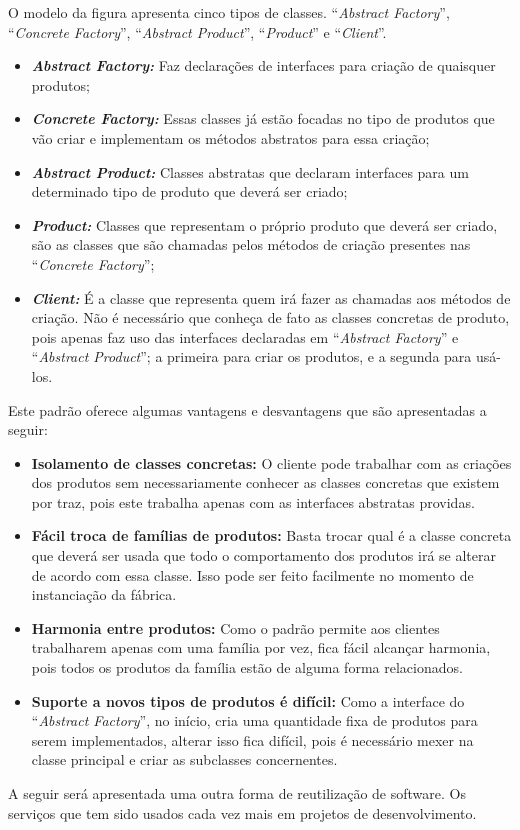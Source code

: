 \begin{apendicesenv}
O modelo da figura apresenta cinco tipos de classes. ``\textit{Abstract Factory}'', ``\textit{Concrete Factory}'', ``\textit{Abstract Product}'', ``\textit{Product}'' e ``\textit{Client}''.

\begin{itemize}
	\item \textbf{\textit{Abstract Factory:}} Faz declarações de interfaces para criação de quaisquer produtos;
	\item \textbf{\textit{Concrete Factory:}} Essas classes já estão focadas no tipo de produtos que vão criar e implementam os métodos abstratos para essa criação;
	\item \textbf{\textit{Abstract Product:}} Classes abstratas que declaram interfaces para um determinado tipo de produto que deverá ser criado;
	\item \textbf{\textit{Product:}} Classes que representam o próprio produto que deverá ser criado, são as classes que são chamadas pelos métodos de criação presentes nas ``\textit{Concrete Factory}'';
	\item \textbf{\textit{Client:}} É a classe que representa quem irá fazer as chamadas aos métodos de criação. Não é necessário que conheça de fato as classes concretas de produto, pois apenas faz uso das interfaces declaradas em ``\textit{Abstract Factory}'' e ``\textit{Abstract Product}''; a primeira para criar os produtos, e a segunda para usá-los.
\end{itemize}

Este padrão oferece algumas vantagens e desvantagens que são apresentadas a seguir:

\begin{itemize}
	\item \textbf{Isolamento de classes concretas:} O cliente pode trabalhar com as criações dos produtos sem necessariamente conhecer as classes concretas que existem por traz, pois este trabalha apenas com as interfaces abstratas providas.
	\item \textbf{Fácil troca de famílias de produtos:} Basta trocar qual é a classe concreta que deverá ser usada que todo o comportamento dos produtos irá se alterar de acordo com essa classe. Isso pode ser feito facilmente no momento de instanciação da fábrica.
	\item \textbf{Harmonia entre produtos:} Como o padrão permite aos clientes trabalharem apenas com uma família por vez, fica fácil alcançar harmonia, pois todos os produtos da família estão de alguma forma relacionados.
	\item \textbf{Suporte a novos tipos de produtos é difícil:} Como a interface do ``\textit{Abstract Factory}'', no início, cria uma quantidade fixa de produtos para serem implementados, alterar isso fica difícil, pois é necessário mexer na classe principal e criar as subclasses concernentes.
\end{itemize}

A seguir será apresentada uma outra forma de reutilização de software. Os serviços que tem sido usados cada vez mais em projetos de desenvolvimento.

\end{apendicesenv}

